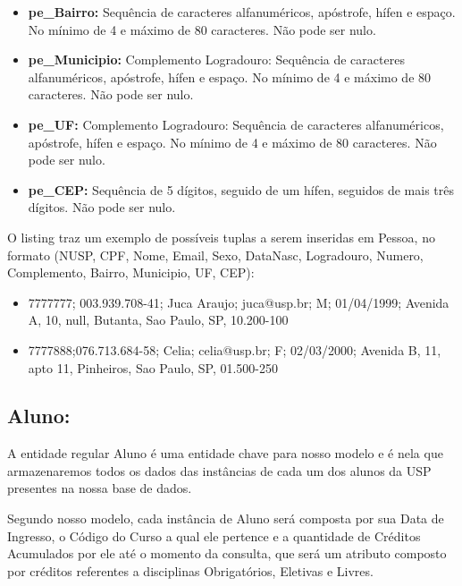 \documentclass{report}
\begin{document}
\begin{itemize}
\begin{itemize}
    \item \textbf{pe\_Bairro:} Sequência de caracteres alfanuméricos, apóstrofe, hífen e espaço. No mínimo de 4 e máximo de 80 caracteres. Não pode ser nulo.
    \item \textbf{pe\_Municipio:} Complemento Logradouro: Sequência de caracteres alfanuméricos, apóstrofe, hífen e espaço. No mínimo de 4 e máximo de 80 caracteres. Não pode ser nulo.
    \item \textbf{pe\_UF:} Complemento Logradouro: Sequência de caracteres alfanuméricos, apóstrofe, hífen e espaço. No mínimo de 4 e máximo de 80 caracteres. Não pode ser nulo.
    \item \textbf{pe\_CEP:} Sequência de 5 dígitos, seguido de um hífen, seguidos de mais três dígitos. Não pode ser nulo.
    \end{itemize}
\end{itemize}


O listing traz um exemplo de possíveis tuplas a serem inseridas em Pessoa, no formato (NUSP, CPF, Nome, Email, Sexo, DataNasc, Logradouro, Numero, Complemento, Bairro, Municipio, UF, CEP):

\begin{itemize}
  \item 7777777; 003.939.708-41; Juca Araujo; juca@usp.br; M; 01/04/1999; Avenida A, 10, null, Butanta, Sao Paulo, SP, 10.200-100
  \item 7777888;076.713.684-58; Celia; celia@usp.br; F; 02/03/2000; Avenida B, 11, apto 11, Pinheiros, Sao Paulo, SP, 01.500-250

\end{itemize}
\subsection{Aluno:}
  A entidade regular Aluno é uma entidade chave para nosso modelo e é nela que armazenaremos todos os dados das instâncias de cada um dos alunos da USP presentes na nossa base de dados.
  
  Segundo nosso modelo, cada instância de Aluno será composta por sua Data de Ingresso, o Código do Curso a qual ele pertence e a quantidade de Créditos Acumulados por ele até o momento da consulta, que será um atributo composto por créditos referentes a disciplinas Obrigatórios, Eletivas e Livres.
  
\end{document}
